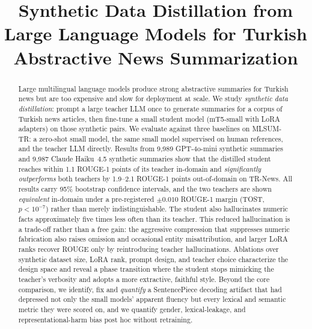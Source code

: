 \documentclass[conference]{IEEEtran}
\begin{document}
\title{Synthetic Data Distillation from Large Language Models for Turkish Abstractive News Summarization}

\author{
}

\maketitle

\begin{abstract}
Large multilingual language models produce strong abstractive summaries for Turkish news but are too expensive and slow for deployment at scale. We study \emph{synthetic data distillation}: prompt a large teacher LLM once to generate summaries for a corpus of Turkish news articles, then fine-tune a small student model (mT5-small with LoRA adapters) on those synthetic pairs. We evaluate against three baselines on MLSUM-TR: a zero-shot small model, the same small model supervised on human references, and the teacher LLM directly. Results from 9{,}989 GPT-4o-mini synthetic summaries and 9{,}987 Claude Haiku~4.5 synthetic summaries show that the distilled student reaches within 1.1 ROUGE-1 points of its teacher in-domain and \emph{significantly outperforms} both teachers by 1.9--2.1 ROUGE-1 points out-of-domain on TR-News. All results carry 95\% bootstrap confidence intervals, and the two teachers are shown \emph{equivalent} in-domain under a pre-registered $\pm0.010$ ROUGE-1 margin (TOST, $p<10^{-7}$) rather than merely indistinguishable. The student also hallucinates numeric facts approximately five times less often than its teacher. This reduced hallucination is a trade-off rather than a free gain: the aggressive compression that suppresses numeric fabrication also raises omission and occasional entity misattribution, and larger LoRA ranks recover ROUGE only by reintroducing teacher hallucinations. Ablations over synthetic dataset size, LoRA rank, prompt design, and teacher choice characterize the design space and reveal a phase transition where the student stops mimicking the teacher's verbosity and adopts a more extractive, faithful style. Beyond the core comparison, we identify, fix and \emph{quantify} a SentencePiece decoding artifact that had depressed not only the small models' apparent fluency but every lexical and semantic metric they were scored on, and we quantify gender, lexical-leakage, and representational-harm bias post hoc without retraining.
\end{abstract}
\end{document}
